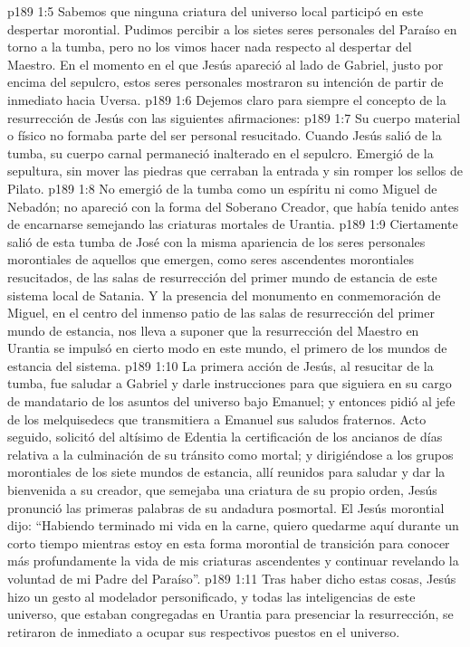 \vs p189 1:5 Sabemos que ninguna criatura del universo local participó en este despertar morontial. Pudimos percibir a los sietes seres personales del Paraíso en torno a la tumba, pero no los vimos hacer nada respecto al despertar del Maestro. En el momento en el que Jesús apareció al lado de Gabriel, justo por encima del sepulcro, estos seres personales mostraron su intención de partir de inmediato hacia Uversa.
\vs p189 1:6 Dejemos claro para siempre el concepto de la resurrección de Jesús con las siguientes afirmaciones:
\vs p189 1:7 Su cuerpo material o físico no formaba parte del ser personal resucitado. Cuando Jesús salió de la tumba, su cuerpo carnal permaneció inalterado en el sepulcro. Emergió de la sepultura, sin mover las piedras que cerraban la entrada y sin romper los sellos de Pilato.
\vs p189 1:8 No emergió de la tumba como un espíritu ni como Miguel de Nebadón; no apareció con la forma del Soberano Creador, que había tenido antes de encarnarse semejando las criaturas mortales de Urantia.
\vs p189 1:9 Ciertamente salió de esta tumba de José con la misma apariencia de los seres personales morontiales de aquellos que emergen, como seres ascendentes morontiales resucitados, de las salas de resurrección del primer mundo de estancia de este sistema local de Satania. Y la presencia del monumento en conmemoración de Miguel, en el centro del inmenso patio de las salas de resurrección del primer mundo de estancia, nos lleva a suponer que la resurrección del Maestro en Urantia se impulsó en cierto modo en este mundo, el primero de los mundos de estancia del sistema.
\vs p189 1:10 \pc La primera acción de Jesús, al resucitar de la tumba, fue saludar a Gabriel y darle instrucciones para que siguiera en su cargo de mandatario de los asuntos del universo bajo Emanuel; y entonces pidió al jefe de los melquisedecs que transmitiera a Emanuel sus saludos fraternos. Acto seguido, solicitó del altísimo de Edentia la certificación de los ancianos de días relativa a la culminación de su tránsito como mortal; y dirigiéndose a los grupos morontiales de los siete mundos de estancia, allí reunidos para saludar y dar la bienvenida a su creador, que semejaba una criatura de su propio orden, Jesús pronunció las primeras palabras de su andadura posmortal. El Jesús morontial dijo: “Habiendo terminado mi vida en la carne, quiero quedarme aquí durante un corto tiempo mientras estoy en esta forma morontial de transición para conocer más profundamente la vida de mis criaturas ascendentes y continuar revelando la voluntad de mi Padre del Paraíso”.
\vs p189 1:11 Tras haber dicho estas cosas, Jesús hizo un gesto al modelador personificado, y todas las inteligencias de este universo, que estaban congregadas en Urantia para presenciar la resurrección, se retiraron de inmediato a ocupar sus respectivos puestos en el universo.
